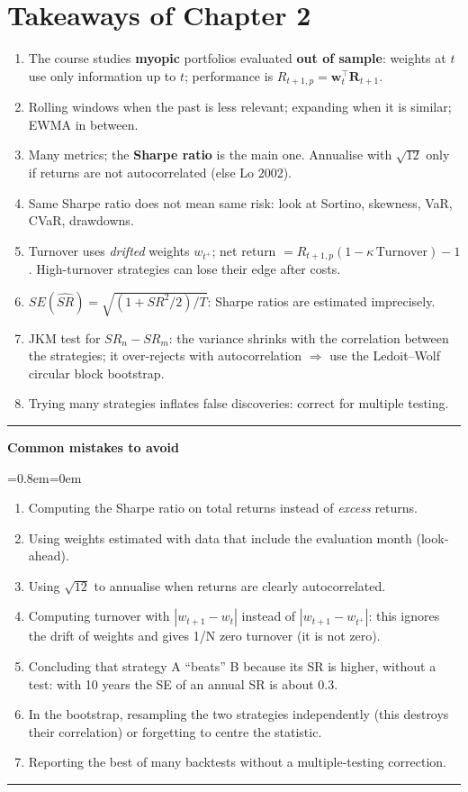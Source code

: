 \documentclass[11pt,a4paper]{report}
\newenvironment{notebox}[1]
  {\par\medskip\Needspace{6\baselineskip}\noindent\rule{\linewidth}{0.4pt}\par\nopagebreak
   \noindent\textbf{#1}\par\nopagebreak
   \begin{list}{}{\leftmargin=0.8em\rightmargin=0em\topsep=2pt}\item[]}
  {\end{list}\nopagebreak\noindent\rule{\linewidth}{0.4pt}\par\medskip}
\newenvironment{mistakes}{\begin{notebox}{Common mistakes to avoid}}{\end{notebox}}
\newcommand{\w}{\bm{w}}
\newcommand{\R}{\bm{R}}
\newcommand{\T}{^{\top}}
\begin{document}
\section{Takeaways of Chapter 2}
\begin{enumerate}
  \item The course studies \textbf{myopic} portfolios evaluated \textbf{out of
    sample}: weights at $t$ use only information up to $t$; performance is
    $R_{t+1,p}=\w_t\T\R_{t+1}$.
  \item Rolling windows when the past is less relevant; expanding when it is
    similar; EWMA in between.
  \item Many metrics; the \textbf{Sharpe ratio} is the main one. Annualise with
    $\sqrt{12}$ only if returns are not autocorrelated (else Lo 2002).
  \item Same Sharpe ratio does not mean same risk: look at Sortino, skewness,
    VaR, CVaR, drawdowns.
  \item Turnover uses \emph{drifted} weights $w_{t^+}$; net return
    $=R_{t+1,p}(1-\kappa\,\text{Turnover})-1$. High-turnover strategies can lose
    their edge after costs.
  \item $SE(\widehat{SR})=\sqrt{(1+SR^2/2)/T}$: Sharpe ratios are estimated imprecisely.
  \item JKM test for $SR_n-SR_m$: the variance shrinks with the correlation
    between the strategies; it over-rejects with autocorrelation $\Rightarrow$ use
    the Ledoit--Wolf circular block bootstrap.
  \item Trying many strategies inflates false discoveries: correct for multiple testing.
\end{enumerate}


\begin{mistakes}
\begin{enumerate}
  \item Computing the Sharpe ratio on total returns instead of \emph{excess} returns.
  \item Using weights estimated with data that include the evaluation month (look-ahead).
  \item Using $\sqrt{12}$ to annualise when returns are clearly autocorrelated.
  \item Computing turnover with $|w_{t+1}-w_t|$ instead of $|w_{t+1}-w_{t^+}|$: this
    ignores the drift of weights and gives 1/N zero turnover (it is not zero).
  \item Concluding that strategy A ``beats'' B because its SR is higher, without a
    test: with 10 years the SE of an annual SR is about 0.3.
  \item In the bootstrap, resampling the two strategies independently (this
    destroys their correlation) or forgetting to centre the statistic.
  \item Reporting the best of many backtests without a multiple-testing correction.
\end{enumerate}
\end{mistakes}
\end{document}
